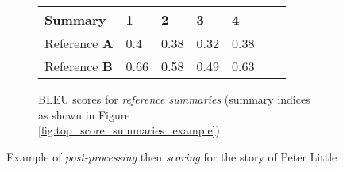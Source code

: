 \begin{figure}[H]
\begin{subfigure}{\textwidth}
\centering
\begin{tabular}{@{}lllllll@{}}
\toprule
Summary     & \textbf{1}    & \textbf{2}    & \textbf{3}    & \textbf{4}    \\ \midrule
Reference \textbf{A} & 0.4  & 0.38 & 0.32 & 0.38  \\
Reference \textbf{B} & 0.66 & 0.58 & 0.49 & 0.63 \\ \bottomrule
\end{tabular}\caption{BLEU scores for \textit{reference summaries} (summary indices as shown in Figure \ref{fig:top_score_summaries_example})}
\end{subfigure}
\caption{Example of \textit{post-processing} then \textit{scoring} for the story of Peter Little}
\label{fig:postprocess_score_example}
\end{figure}